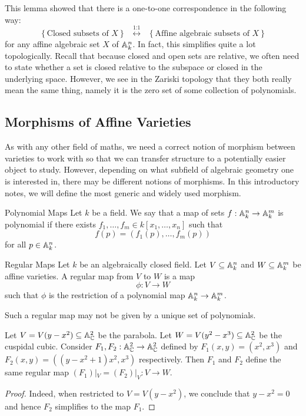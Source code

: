 \documentclass[a4paper]{article}
\begin{document}
This lemma showed that there is a one-to-one correspondence in the following way: $$\left\{\text{Closed subsets of }X\right\}\;\;\overset{\text{1:1}}{\longleftrightarrow}\;\;\left\{\text{Affine algebraic subsets of }X\right\}$$ for any affine algebraic set $X$ of $\mathbb{A}_k^n$. In fact, this simplifies quite a lot topologically. Recall that because closed and open sets are relative, we often need to state whether a set is closed relative to the subspace or closed in the underlying space. However, we see in the Zariski topology that they both really mean the same thing, namely it is the zero set of some collection of polynomials. 

\subsection{Morphisms of Affine Varieties}
As with any other field of maths, we need a correct notion of morphism between varieties to work with so that we can transfer structure to a potentially easier object to study. However, depending on what subfield of algebraic geometry one is interested in, there may be different notions of morphisms. In this introductory notes, we will define the most generic and widely used morphism. 

\begin{defn}{Polynomial Maps}{} Let $k$ be a field. We say that a map of sets $f:\mathbb{A}_k^n\to\mathbb{A}_k^m$ is polynomial if there exists $f_1,\dots,f_m\in k[x_1,\dots,x_n]$ such that $$f(p)=(f_1(p),\dots,f_m(p))$$ for all $p\in\mathbb{A}_k^n$. 
\end{defn}

\begin{defn}{Regular Maps}{} Let $k$ be an algebraically closed field. Let $V\subseteq\mathbb{A}_k^n$ and $W\subseteq\mathbb{A}_k^m$ be affine varieties. A regular map from $V$ to $W$ is a map $$\phi:V\to W$$ such that $\phi$ is the restriction of a polynomial map $\mathbb{A}_k^n\to\mathbb{A}_k^m$. 
\end{defn}

Such a regular map may not be given by a unique set of polynomials. 

\begin{eg}{}{} Let $V=V(y-x^2)\subseteq\mathbb{A}_{\mathbb{C}}^2$ be the parabola. Let $W=V(y^2-x^3)\subseteq\mathbb{A}_{\mathbb{C}}^2$ be the cuspidal cubic. Consider $F_1,F_2:\mathbb{A}_{\mathbb{C}}^2\to\mathbb{A}_{\mathbb{C}}^2$ defined by $F_1(x,y)=(x^2,x^3)$ and $F_2(x,y)=((y-x^2+1)x^2,x^3)$ respectively. Then $F_1$ and $F_2$ define the same regular map $(F_1)|_V=(F_2)|_V:V\to W$. \tcbline
\begin{proof}
Indeed, when restricted to $V=V(y-x^2)$, we conclude that $y-x^2=0$ and hence $F_2$ simplifies to the map $F_1$. 
\end{proof}
\end{eg}
\end{document}

